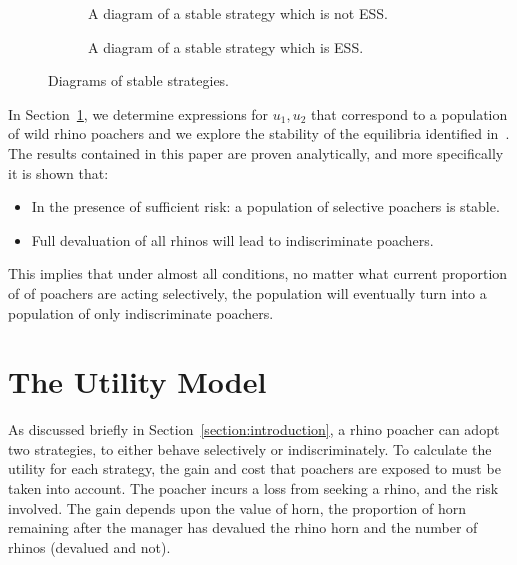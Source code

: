 \documentclass[10pt]{article}
\begin{document}
\begin{figure}[!htbp]
\begin{center}
    \begin{subfigure}{0.35\textwidth}
    
    \caption{\label{fig:stable_diagram} A diagram of a stable strategy which
    is not ESS.}
    \end{subfigure}
    \begin{subfigure}{0.35\textwidth}
    
    \caption{\label{fig:ess_diagram}A diagram of a stable strategy which is ESS.}
    \end{subfigure}
        \caption{\label{fig:stable_ess_driagrams} Diagrams of stable strategies.}
\end{center}
\end{figure}

In Section~\ref{section:the_model}, we determine expressions
for \(u_1, u_2\) that correspond to a population of wild rhino poachers and we
explore the stability of the equilibria identified in~\cite{Lee}. The results
contained in this paper are proven analytically, and more specifically it is
shown that:

\begin{itemize}
    \item In the presence of sufficient risk: a population of selective poachers
        is stable.
    \item Full devaluation of all rhinos will lead to indiscriminate poachers.
\end{itemize}

This implies that under almost all conditions, no matter what current proportion
of
of poachers are acting selectively, the population will eventually turn into a
population of only indiscriminate poachers.

\section{The Utility Model}\label{section:the_model}

As discussed briefly in Section~\ref{section:introduction}, a rhino poacher
can adopt two strategies, to either behave selectively
or indiscriminately. To calculate the utility for each strategy, the gain and cost
that poachers are exposed to must be taken into account. The poacher incurs a
loss from seeking a rhino, and the risk involved. The gain depends upon the value
of horn, the proportion of horn remaining after the manager has devalued the
rhino horn and the number of rhinos (devalued and not).
\end{document}
